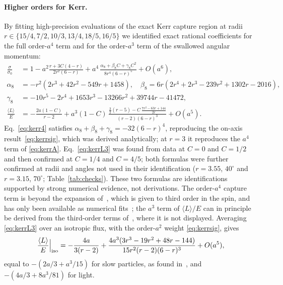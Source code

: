\documentclass[11pt,a4paper]{article}
\theoremstyle{remark}
\numberwithin{equation}{section}
\begin{document}
\paragraph{Higher orders for Kerr.} By fitting high-precision
evaluations of the exact Kerr capture region at radii $r\in\{15/4,7/2,10/3,13/4,18/5,16/5\}$ we
identified exact rational coefficients for the full order-$a^4$ term and for the order-$a^3$ term of
the swallowed angular momentum:
\begin{align}
\frac{\sigma}{\sigma_0}&=1-a^2\frac{r+3C(4-r)}{2r^2(6-r)}
+a^4\,\frac{\alpha_8+\beta_8C+\gamma_8C^2}{8r^4(6-r)^5}+O(a^6),\label{eq:kerr4}\\
\alpha_8&=-r^2(2r^3+42r^2-549r+1458),\quad
\beta_8=6r(2r^4+2r^3-239r^2+1302r-2016),\nonumber\\
\gamma_8&=-10r^5-2r^4+1653r^3-13266r^2+39744r-41472,\nonumber\\
\frac{\langle L\rangle}{E}&=-\frac{2a(1-C)}{r-2}
+a^3(1-C)\,\frac{\tfrac32(r-5)-C\,\frac{7r^2-63r+144}{2r}}{(r-2)(6-r)^3}+O(a^5).\label{eq:kerrL3}
\end{align}
Eq.~\eqref{eq:kerr4} satisfies $\alpha_8+\beta_8+\gamma_8=-32(6-r)^4$, reproducing the on-axis
result~\eqref{eq:kerrsig}, which was derived analytically; at $r=3$ it reproduces the $a^4$ term
of \eqref{eq:kerrA}. Eq.~\eqref{eq:kerrL3} was found from data at $C=0$ and $C=1/2$ and then
confirmed at $C=1/4$ and $C=4/5$; both formulas were further confirmed at radii and angles not used in
their identification ($r=3.55$, $40^\circ$ and $r=3.15$, $70^\circ$; Table~\ref{tab:checks}). These two formulas are identifications
supported by strong numerical evidence, not derivations. The order-$a^4$ capture term is beyond the
expansion of~\cite{MachMomenniaSarbach2026}, which is given to third order in the spin, and has only been available as numerical fits~\cite{Karydas2026};
the $a^3$ term of $\langle L\rangle/E$ can in principle be derived from the third-order terms of~\cite{MachMomenniaSarbach2026}, where it is not displayed. Averaging \eqref{eq:kerrL3} over an
isotropic flux, with the order-$a^2$ weight \eqref{eq:kerrsig}, gives
\begin{equation}
\frac{\langle L\rangle}{E}\Big|_{\rm iso}=-\frac{4a}{3(r-2)}
+\frac{4a^3(3r^3-19r^2+48r-144)}{15r^2(r-2)(6-r)^3}+O(a^5),
\end{equation}
equal to $-(2a/3+a^3/15)$ for slow particles, as found in~\cite{MachMomenniaSarbach2026,MachMomenniaSarbach2026b},
and $-(4a/3+8a^3/81)$ for light.
\end{document}
